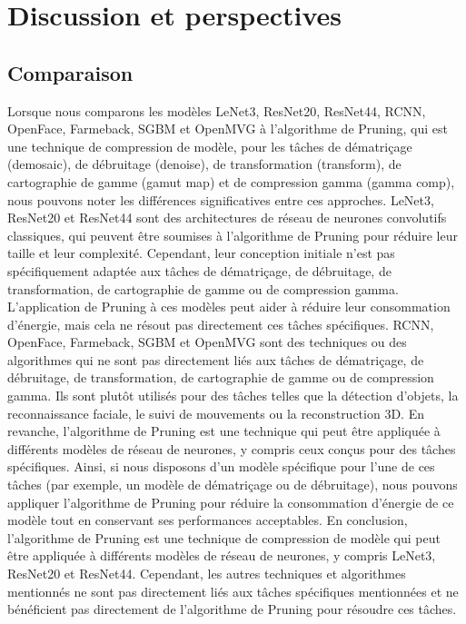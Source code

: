 \section*{Discussion et perspectives}
\subsection*{Comparaison}
Lorsque nous comparons les modèles LeNet3, ResNet20, ResNet44, RCNN, OpenFace, Farmeback, SGBM et OpenMVG à l'algorithme de Pruning, qui est une technique de compression de modèle, pour les tâches de dématriçage (demosaic), de débruitage (denoise), de transformation (transform), de cartographie de gamme (gamut map) et de compression gamma (gamma comp), nous pouvons noter les différences significatives entre ces approches.
LeNet3, ResNet20 et ResNet44 sont des architectures de réseau de neurones convolutifs classiques, qui peuvent être soumises à l'algorithme de Pruning pour réduire leur taille et leur complexité. Cependant, leur conception initiale n'est pas spécifiquement adaptée aux tâches de dématriçage, de débruitage, de transformation, de cartographie de gamme ou de compression gamma. L'application de Pruning à ces modèles peut aider à réduire leur consommation d'énergie, mais cela ne résout pas directement ces tâches spécifiques.
RCNN, OpenFace, Farmeback, SGBM et OpenMVG sont des techniques ou des algorithmes qui ne sont pas directement liés aux tâches de dématriçage, de débruitage, de transformation, de cartographie de gamme ou de compression gamma. Ils sont plutôt utilisés pour des tâches telles que la détection d'objets, la reconnaissance faciale, le suivi de mouvements ou la reconstruction 3D.
En revanche, l'algorithme de Pruning est une technique qui peut être appliquée à différents modèles de réseau de neurones, y compris ceux conçus pour des tâches spécifiques. Ainsi, si nous disposons d'un modèle spécifique pour l'une de ces tâches (par exemple, un modèle de dématriçage ou de débruitage), nous pouvons appliquer l'algorithme de Pruning pour réduire la consommation d'énergie de ce modèle tout en conservant ses performances acceptables.
En conclusion, l'algorithme de Pruning est une technique de compression de modèle qui peut être appliquée à différents modèles de réseau de neurones, y compris LeNet3, ResNet20 et ResNet44. Cependant, les autres techniques et algorithmes mentionnés ne sont pas directement liés aux tâches spécifiques mentionnées et ne bénéficient pas directement de l'algorithme de Pruning pour résoudre ces tâches.

